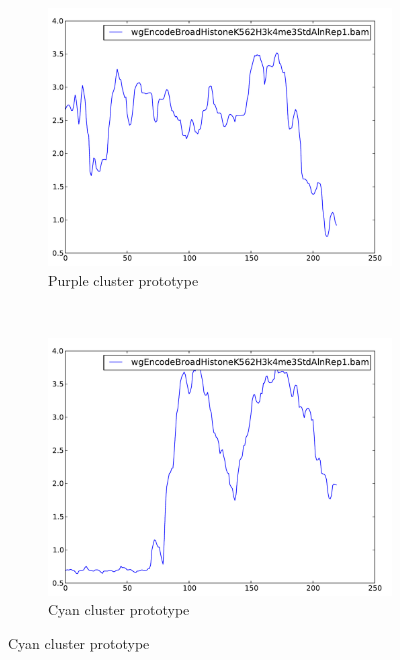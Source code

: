 \documentclass[parskip]{cs4rep}
\begin{document}
\begin{figure}[t,b]
    \centering
    \begin{subfigure}[b]{0.22\textwidth}
        \includegraphics[width=\textwidth]{figures/evaluation/exon_stretching/cluster-2.pdf}
        \caption{Purple cluster prototype}
        \label{fig:evaluation:exon_stretching:clusters:1:prototype}
    \end{subfigure}
    ~
    \begin{subfigure}[b]{0.22\textwidth}
        \includegraphics[width=\textwidth]{figures/evaluation/exon_stretching/cluster-1.pdf}
        \caption{Cyan cluster prototype}
        \label{fig:evaluation:exon_stretching:clusters:2:prototype}
    \end{subfigure}

\end{figure}
\end{document}
